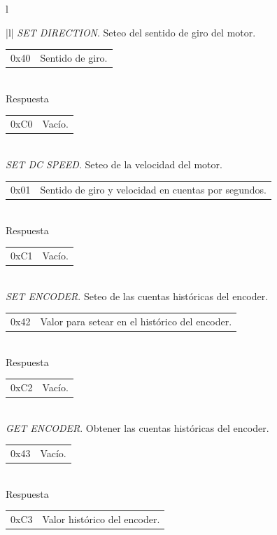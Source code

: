 \begin{table}
	\begin{center}
		\begin{tabular}{l}
			\begin{tabular}{|l|}
				\hline
				\emph{SET DIRECTION}. Seteo del sentido de giro del motor. \\
				\hline
				\begin{tabular}{c|l}
					0x40 & Sentido de giro. \\
				\end{tabular}
				\\
				\hline
				Respuesta \\
				\hline
				\begin{tabular}{c|l}
					0xC0 & Vac\'io. \\
				\end{tabular}
				\\
	
				\hline\hline
				\emph{SET DC SPEED}. Seteo de la velocidad del motor. \\
				\hline
				\begin{tabular}{c|l}
					0x01 & Sentido de giro y velocidad en cuentas por segundos.\\
				\end{tabular}
				\\
				\hline
				Respuesta \\
				\hline
				\begin{tabular}{c|l}
					0xC1 & Vac\'io. \\
				\end{tabular}
				\\
	
				\hline\hline
				\emph{SET ENCODER}. Seteo de las cuentas hist\'oricas del encoder. \\
				\hline
				\begin{tabular}{c|l}
					0x42 & Valor para setear en el hist\'orico del encoder.\\
				\end{tabular}
				\\
				\hline
				Respuesta \\
				\hline
				\begin{tabular}{c|l}
					0xC2 & Vac\'io. \\
				\end{tabular}
				\\
	
				\hline\hline
				\emph{GET ENCODER}. Obtener las cuentas hist\'oricas del encoder. \\
				\hline
				\begin{tabular}{c|l}
					0x43 & Vac\'io. \\
				\end{tabular}
				\\
				\hline
				Respuesta \\
				\hline
				\begin{tabular}{c|l}
					0xC3 & Valor hist\'orico del encoder.\\
				\end{tabular}
				\\
	

\end{tabular}
\end{tabular}
\end{center}
\end{table}
